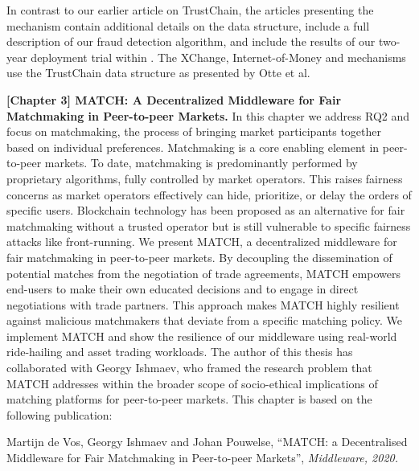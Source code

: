 In contrast to our earlier article on TrustChain, the articles presenting the \TrustChain{} mechanism contain additional details on the data structure, include a full description of our fraud detection algorithm, and include the results of our two-year deployment trial within \Tribler{}.
The XChange, Internet-of-Money and \Dappcoder{} mechanisms use the TrustChain data structure as presented by Otte et al.

\textbf{[Chapter 3] MATCH: A Decentralized Middleware for Fair Matchmaking in Peer-to-peer Markets.}
In this chapter we address RQ2 and focus on matchmaking, the process of bringing market participants together based on individual preferences.
Matchmaking is a core enabling element in peer-to-peer markets.
To date, matchmaking is predominantly performed by proprietary algorithms, fully controlled by market operators.
This raises fairness concerns as market operators effectively can hide, prioritize, or delay the orders of specific users.
Blockchain technology has been proposed as an alternative for fair matchmaking without a trusted operator but is still vulnerable to specific fairness attacks like front-running.
We present MATCH, a decentralized middleware for fair matchmaking in peer-to-peer markets.
By decoupling the dissemination of potential matches from the negotiation of trade agreements, MATCH empowers end-users to make their own educated decisions and to engage in direct negotiations with trade partners.
This approach makes MATCH highly resilient against malicious matchmakers that deviate from a specific matching policy.
We implement MATCH and show the resilience of our middleware using real-world ride-hailing and asset trading workloads.
The author of this thesis has collaborated with Georgy Ishmaev, who framed the research problem that MATCH addresses within the broader scope of socio-ethical implications of matching platforms for peer-to-peer markets.
This chapter is based on the following publication:

Martijn de Vos, Georgy Ishmaev and Johan Pouwelse, \enquote{MATCH: a Decentralised Middleware for Fair Matchmaking in Peer-to-peer Markets}, \emph{Middleware, 2020.}\\

